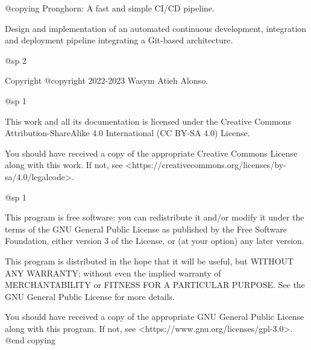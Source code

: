 @copying
Pronghorn: A fast and simple CI/CD pipeline.

Design and implementation of an automated continuous development, integration and deployment pipeline integrating a Git-based architecture.

@sp 2

Copyright @copyright{} 2022-2023 Wasym Atieh Alonso.

@sp 1

This work and all its documentation is licensed under the Creative Commons Attribution-ShareAlike 4.0 International (CC BY-SA 4.0) License.

You should have received a copy of the appropriate Creative Commons License along with this work. If not, see <https://creativecommons.org/licenses/by-sa/4.0/legalcode>.

@sp 1

This program is free software: you can redistribute it and/or modify it under the terms of the GNU General Public License as published by the Free Software Foundation, either version 3 of the License, or (at your option) any later version.

This program is distributed in the hope that it will be useful, but WITHOUT ANY WARRANTY; without even the implied warranty of MERCHANTABILITY or FITNESS FOR A PARTICULAR PURPOSE. See the GNU General Public License for more details.

You should have received a copy of the appropriate GNU General Public License along with this program. If not, see <https://www.gnu.org/licenses/gpl-3.0>.
@end copying
